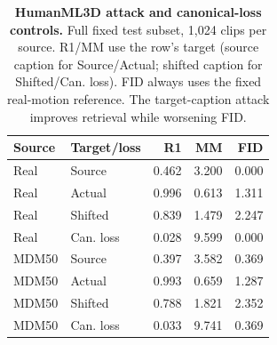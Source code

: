 \begin{table}[t]\centering\small
\caption{\textbf{HumanML3D attack and canonical-loss controls.} Full fixed test subset, 1,024 clips per source. R1/MM use the row's target (source caption for Source/Actual; shifted caption for Shifted/Can. loss). FID always uses the fixed real-motion reference. The target-caption attack improves retrieval while worsening FID.}
\label{tab:humanmlfull}
\begin{tabular}{llrrr}\toprule
Source&Target/loss&R1&MM&FID\\\midrule
Real&Source&0.462&3.200&0.000\\
Real&Actual&0.996&0.613&1.311\\
Real&Shifted&0.839&1.479&2.247\\
Real&Can. loss&0.028&9.599&0.000\\
MDM50&Source&0.397&3.582&0.369\\
MDM50&Actual&0.993&0.659&1.287\\
MDM50&Shifted&0.788&1.821&2.352\\
MDM50&Can. loss&0.033&9.741&0.369\\
\bottomrule\end{tabular}\end{table}
